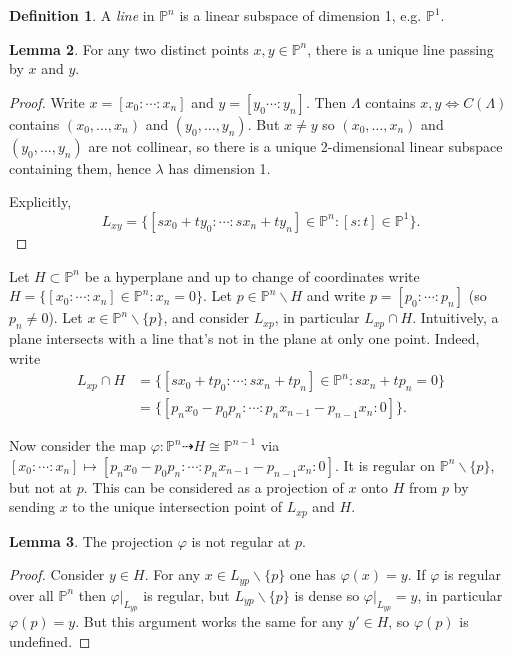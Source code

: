 \documentclass{article}
\newcommand{\p}{\mathbb{P}}
\theoremstyle{definition}
\newtheorem{defn}{Definition}[subsection]
\newtheorem{lemma}[defn]{Lemma}
\begin{document}
\begin{defn}
A \textit{line} in $\p^n$ is a linear subspace of dimension 1, e.g. $\p^1$.
\end{defn}

\begin{lemma}
For any two distinct points $x,y\in\p^n$, there is a unique line passing by $x$ and $y$.
\end{lemma}
\begin{proof}
Write $x=[x_0:\cdots:x_n]$ and $y=[y_0\cdots:y_n]$. Then $\Lambda$ contains $x,y\iff C(\Lambda)$ contains $(x_0,\ldots,x_n)$ and $(y_0,\ldots,y_n)$. But $x\neq y$ so $(x_0,\ldots,x_n)$ and $(y_0,\ldots,y_n)$ are not collinear, so there is a unique 2-dimensional linear subspace containing them, hence $\lambda$ has dimension 1.

Explicitly,
\[
L_{xy}=\{[sx_0+ty_0:\cdots:sx_n+ty_n]\in\p^n:[s:t]\in\p^1\}.
\]
\end{proof}

Let $H\subset\p^n$ be a hyperplane and up to change of coordinates write $H=\{[x_0:\cdots:x_n]\in\p^n:x_n=0\}$. Let $p\in\p^n\backslash H$ and write $p=[p_0:\cdots:p_n]$ (so $p_n\neq 0$). Let $x\in\p^n\backslash\{p\}$, and consider $L_{xp}$, in particular $L_{xp}\cap H$. Intuitively, a plane intersects with a line that's not in the plane at only one point. Indeed, write
\[
\begin{aligned}
L_{xp}\cap H&=\{[sx_0+tp_0:\cdots:sx_n+tp_n]\in\p^n:sx_n+tp_n=0\} \\
&=\{[p_nx_0-p_0p_n:\cdots:p_nx_{n-1}-p_{n-1}x_n:0]\}.
\end{aligned}
\]

Now consider the map $\varphi:\p^n\dashrightarrow H\cong\p^{n-1}$ via $[x_0:\cdots:x_n]\mapsto [p_nx_0-p_0p_n:\cdots:p_nx_{n-1}-p_{n-1}x_n:0]$. It is regular on $\p^n\backslash\{p\}$, but not at $p$. This can be considered as a projection of $x$ onto $H$ from $p$ by sending $x$ to the unique intersection point of $L_{xp}$ and $H$.

\begin{lemma}
The projection $\varphi$ is not regular at $p$.
\end{lemma}
\begin{proof}
Consider $y\in H$. For any $x\in L_{yp}\backslash\{p\}$ one has $\varphi(x)=y$. If $\varphi$ is regular over all $\p^n$ then $\left.\varphi\right|_{L_{yp}}$ is regular, but $L_{yp}\backslash\{p\}$ is dense so $\left.\varphi\right|_{L_{yp}}=y$, in particular $\varphi(p)=y$. But this argument works the same for any $y'\in H$, so $\varphi(p)$ is undefined.
\end{proof}
\end{document}
